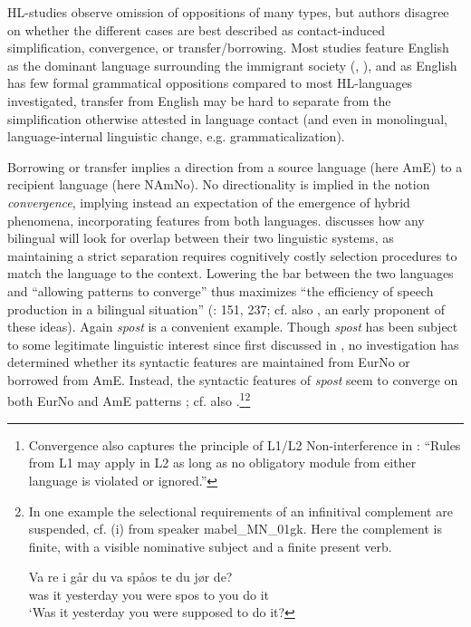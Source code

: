 \documentclass[output=paper]{langscibook}
\begin{document}
HL-studies observe omission of oppositions of many types, but authors disagree on whether the different cases are best described as contact-induced simplification, convergence, or transfer/borrowing. Most studies feature English as the dominant language surrounding the immigrant society (\citealt{Montrul2016}, \citealt{BenmamounEtAl2013}), and as English has few formal grammatical oppositions compared to most HL-languages investigated, transfer from English may be hard to separate from the simplification otherwise attested in language contact (and even in monolingual, language-internal linguistic change, e.g. grammaticalization). 

Borrowing or transfer implies a direction from a source language (here AmE) to a recipient language (here NAmNo). No directionality is implied in the notion \textit{convergence}, implying instead an expectation of the emergence of hybrid phenomena, incorporating features from both languages. \citet{Matras2009} discusses how any bilingual will look for overlap between their two linguistic systems, as maintaining a strict separation requires cognitively costly selection procedures to match the language to the context. Lowering the bar between the two languages and “allowing patterns to converge” thus maximizes “the efficiency of speech production in a bilingual situation” (\citealt{Matras2009}: 151, 237; cf. also \citealt{Wald1987}, an early proponent of these ideas). Again \textit{spost} is a convenient example. Though \textit{spost} has been subject to some legitimate linguistic interest since first discussed in \citet{EideHjelde2012,EideHjelde2015Borrowing}, no investigation has determined whether its syntactic features are maintained from EurNo or borrowed from AmE. Instead, the syntactic features of \textit{spost} seem to converge on both EurNo and AmE patterns \citep[329]{PutnamSøfteland2021}; cf. also .\footnote{Convergence also captures the principle of L1/L2 Non-interference in \citet[3]{Roeper2016}: “Rules from L1 may apply in L2 as long as no obligatory module from either language is violated or ignored.”}\footnote{In one example the selectional requirements of an infinitival complement are suspended, cf. (i) from speaker mabel\_MN\_01gk. Here the complement is finite, with a visible nominative subject and a finite present verb. 

\ea
\gll Va re {i går}  du va spåos te du jør de?\\
     was it yesterday you were spos to you do it\\
\glt ‘Was it yesterday you were supposed to do it?
\z}
\end{document}
